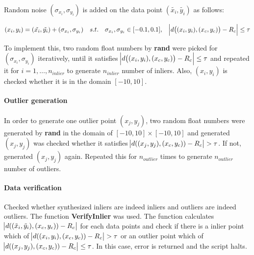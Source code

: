 \documentclass[paper=a4, fontsize=11pt]{scrartcl} %
\numberwithin{equation}{section} %
\numberwithin{figure}{section} %
\numberwithin{table}{section} %
\newcommand{\funcname}[1]{\textbf{#1}}
\begin{document}
Random noise $(\sigma_{x_{i}}, \sigma_{y_{i}})$ is added on the data point $(\tilde{x_{i}}, \tilde{y_{i}})$ as follows:

\begin{equation*}
(x_{i}, y_{i}) = (\tilde{x_{i}}, \tilde{y_{i}}) + (\sigma_{x_{i}}, \sigma_{y_{i}}) 
\quad s.t. \quad \sigma_{x_{i}}, \sigma_{y_{i}} \in [-0.1, 0.1], \quad \abs{d \big( (x_{i}, y_{i}), (x_{c}, y_{c}) \big) - R_{c}} \leq \tau 
\end{equation*}

To implement this, two random float numbers by \funcname{rand} were picked for $(\sigma_{x_{i}}, \sigma_{y_{i}})$ iteratively, until it satisfies $\abs{d \big( (x_{i}, y_{i}), (x_{c}, y_{c}) \big) - R_{c}} \leq \tau$ and repeated it for $i=1,\dots,n_{inlier}$ to generate $n_{inlier}$ number of inliers. Also, $(x_{i}, y_{i})$ is checked whether it is in the domain $[-10, 10]$.

\paragraph{Outlier generation}

In order to generate one outlier point $(x_{j}, y_{j})$, two random float numbers were generated by \funcname{rand} in the domain of $[-10, 10] \times [-10, 10]$ and generated $(x_{j}, y_{j})$ was checked whether it satisfies $\abs{d((x_{j}, y_{j}), (x_{c}, y_{c})) - R_{c}} > \tau$. If not, generated $(x_{j}, y_{j})$ again. Repeated this for $n_{outlier}$ times to generate $n_{outlier}$ number of outliers.

\paragraph{Data verification}

Checked whether synthesized inliers are indeed inliers and outliers are indeed outliers. The function \funcname{VerifyInlier} was used. The function calculates $\abs{d((\tilde{x}_{i}, \tilde{y}_{i}), (x_{c}, y_{c})) - R_{c}}$ for each data points and check if there is a inlier point which of $\abs{d((x_{i}, y_{i}), (x_{c}, y_{c})) - R_{c}} > \tau$ or an outlier point which of $\abs{d((x_{j}, y_{j}), (x_{c}, y_{c})) - R_{c}} \leq \tau$. In this case, error is returned and the script halts. 

\end{document}

